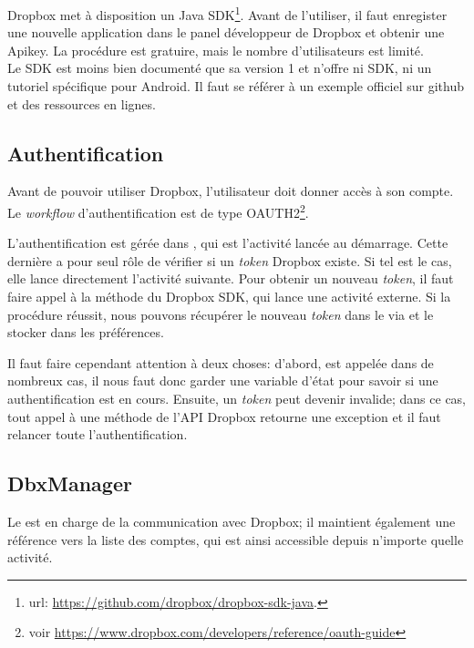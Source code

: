 Dropbox met à disposition un Java SDK\footnote{url: \url{https://github.com/dropbox/dropbox-sdk-java}.}. Avant de l'utiliser, il faut enregister une nouvelle application dans le panel développeur de Dropbox et obtenir une Apikey. La procédure est gratuire, mais le nombre d'utilisateurs est limité. \\
Le SDK est moins bien documenté que sa version 1 et n'offre ni SDK, ni un tutoriel spécifique pour Android. Il faut se référer à un exemple officiel sur github et des ressources en lignes.

\subsection{Authentification}

Avant de pouvoir utiliser Dropbox, l'utilisateur doit donner accès à son compte. 
Le \emph{workflow} d'authentification est de type OAUTH2\footnote{voir \url{https://www.dropbox.com/developers/reference/oauth-guide}}. 

L'authentification est gérée dans , qui est l'activité lancée au démarrage. Cette dernière a pour seul rôle de vérifier si un \emph{token} Dropbox existe. Si tel est le cas, elle lance directement l'activité suivante. Pour obtenir un nouveau \emph{token}, il faut faire appel à la méthode  du Dropbox SDK, qui lance une activité externe. Si la procédure réussit, nous pouvons récupérer le nouveau \emph{token} dans le  via  et le stocker dans les préférences. 

Il faut faire cependant attention à deux choses: d'abord,  est appelée dans de nombreux cas, il nous faut donc garder une variable d'état pour savoir si une authentification est en cours. Ensuite, un \emph{token} peut devenir invalide; dans ce cas, tout appel à une méthode de l'API Dropbox retourne une exception et il faut relancer toute l'authentification. 

\subsection{DbxManager}

Le  est en charge de la communication avec Dropbox; il maintient également une référence vers la liste des comptes, qui est ainsi accessible depuis n'importe quelle activité.  

